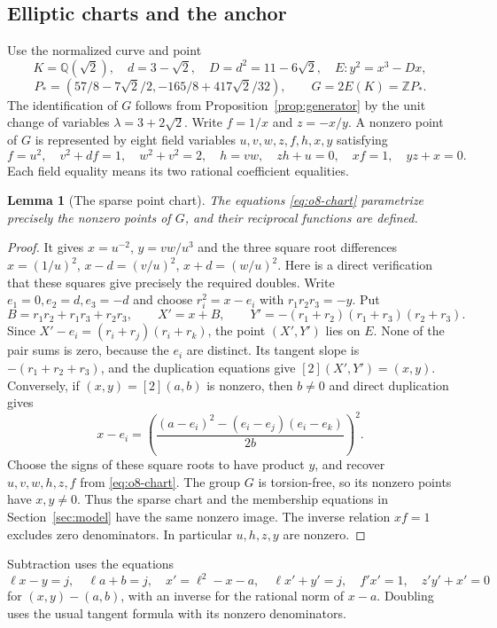 \documentclass[11pt]{article}
\newtheorem{lemma}[theorem]{Lemma}
\theoremstyle{definition}
\theoremstyle{remark}
\newcommand{\Q}{\mathbb Q}
\newcommand{\Z}{\mathbb Z}
\begin{document}
\subsection{Elliptic charts and the anchor}

Use the normalized curve and point
\[
 K=\Q(\sqrt2),\quad d=3-\sqrt2,\quad D=d^2=11-6\sqrt2,
 \quad E:y^2=x^3-Dx,
\]
\[
 P_*=(57/8-7\sqrt2/2,-165/8+417\sqrt2/32),
 \qquad G=2E(K)=\Z P_*.
\]
The identification of $G$ follows from Proposition~\ref{prop:generator}
by the unit change of variables $\lambda=3+2\sqrt2$.
Write $f=1/x$ and $z=-x/y$. A nonzero point of $G$ is represented by
eight field variables $u,v,w,z,f,h,x,y$ satisfying
\begin{equation}\label{eq:o8-chart}
 f=u^2,\quad v^2+df=1,\quad w^2+v^2=2,\quad h=vw,
 \quad zh+u=0,\quad xf=1,\quad yz+x=0.
\end{equation}
Each field equality means its two rational coefficient equalities.
\begin{lemma}[The sparse point chart]\label{lem:o8-chart}
The equations \eqref{eq:o8-chart} parametrize precisely the nonzero points
of $G$, and their reciprocal functions are defined.
\end{lemma}
\begin{proof}
It gives $x=u^{-2}$, $y=vw/u^3$ and the three square root differences
$x=(1/u)^2$, $x-d=(v/u)^2$, $x+d=(w/u)^2$.
Here is a direct verification that these squares give precisely the
required doubles. Write $e_1=0,e_2=d,e_3=-d$ and choose
$r_i^2=x-e_i$ with $r_1r_2r_3=-y$. Put
\[
 B=r_1r_2+r_1r_3+r_2r_3,\qquad
 X'=x+B,\qquad
 Y'=-(r_1+r_2)(r_1+r_3)(r_2+r_3).
\]
Since $X'-e_i=(r_i+r_j)(r_i+r_k)$, the point $(X',Y')$ lies on
$E$. None of the pair sums is zero, because the $e_i$ are distinct.
Its tangent slope is $-(r_1+r_2+r_3)$, and the duplication equations
give $[2](X',Y')=(x,y)$.
Conversely, if $(x,y)=[2](a,b)$ is nonzero, then $b\ne0$ and direct
duplication gives
\[
 x-e_i=\left(
 \frac{(a-e_i)^2-(e_i-e_j)(e_i-e_k)}{2b}\right)^2.
\]
Choose the signs of these square roots to have product $y$, and recover
$u,v,w,h,z,f$ from \eqref{eq:o8-chart}. The group $G$ is torsion-free, so its nonzero points have
$x,y\ne0$. Thus the sparse chart and the membership equations in
Section~\ref{sec:model} have the same nonzero image.
The inverse relation $xf=1$ excludes zero denominators. In particular
$u,h,z,y$ are nonzero.
\end{proof}

Subtraction uses the equations
\[
 \ell x-y=j,\quad \ell a+b=j,\quad
 x'=\ell^2-x-a,\quad \ell x'+y'=j,\quad
 f'x'=1,\quad z'y'+x'=0
\]
for $(x,y)-(a,b)$, with an inverse for the rational norm of $x-a$.
Doubling uses the usual tangent formula with its nonzero denominators.
\end{document}
